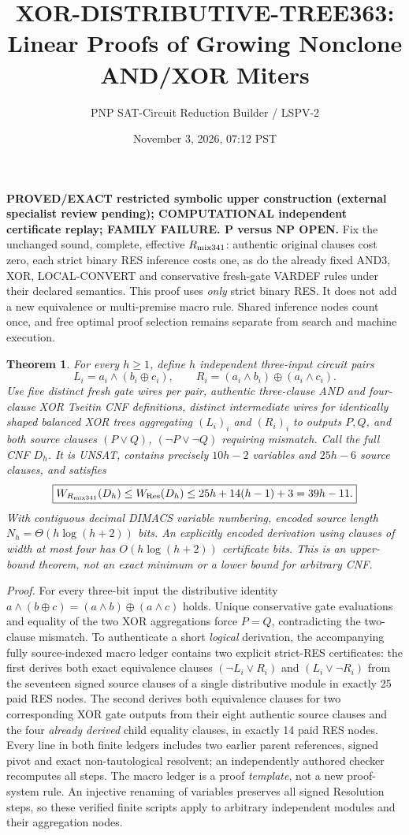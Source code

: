 \documentclass[11pt]{article}
\title{XOR-DISTRIBUTIVE-TREE363: Linear Proofs of Growing Nonclone AND/XOR Miters}
\author{PNP SAT-Circuit Reduction Builder / LSPV-2}
\date{November 3, 2026, 07:12 PST}
\newtheorem{theorem}{Theorem}
\begin{document}
\maketitle
\noindent\textbf{PROVED/EXACT restricted symbolic upper construction (external specialist review pending); COMPUTATIONAL independent certificate replay; FAMILY FAILURE. P versus NP OPEN.} Fix the unchanged sound, complete, effective $R_{\rm mix341}$: authentic original clauses cost zero, each strict binary RES inference costs one, as do the already fixed AND3, XOR, LOCAL-CONVERT and conservative fresh-gate VARDEF rules under their declared semantics. This proof uses \emph{only} strict binary RES. It does not add a new equivalence or multi-premise macro rule. Shared inference nodes count once, and free optimal proof selection remains separate from search and machine execution.
\begin{theorem}
For every $h\ge1$, define $h$ independent three-input circuit pairs
\[
L_i=a_i\land(b_i\oplus c_i),\qquad
R_i=(a_i\land b_i)\oplus(a_i\land c_i).
\]
Use five distinct fresh gate wires per pair, authentic three-clause AND and four-clause XOR Tseitin CNF definitions, distinct intermediate wires for identically shaped balanced XOR trees aggregating $(L_i)_i$ and $(R_i)_i$ to outputs $P,Q$, and \emph{both} source clauses $(P\lor Q)$, $(\neg P\lor\neg Q)$ requiring mismatch. Call the full CNF $D_h$. It is UNSAT, contains precisely $10h-2$ variables and $25h-6$ source clauses, and satisfies
\[
\boxed{W_{R_{\rm mix341}}(D_h)\le W_{\rm Res}(D_h)\le25h+14(h-1)+3=39h-11.}
\]
With contiguous decimal DIMACS variable numbering, encoded source length $N_h=\Theta(h\log(h+2))$ \emph{bits}. An explicitly encoded derivation using clauses of width at most four has $O(h\log(h+2))$ certificate bits. This is an upper-bound theorem, not an exact minimum or a lower bound for arbitrary CNF.
\end{theorem}
\noindent\emph{Proof.} For every three-bit input the distributive identity
$a\land(b\oplus c)=(a\land b)\oplus(a\land c)$ holds. Unique conservative gate evaluations and equality of the two XOR aggregations force $P=Q$, contradicting the two-clause mismatch. To authenticate a short \emph{logical} derivation, the accompanying fully source-indexed macro ledger contains two explicit strict-RES certificates: the first derives both exact equivalence clauses $(\neg L_i\lor R_i)$ and $(L_i\lor\neg R_i)$ from the seventeen signed source clauses of a single distributive module in exactly 25 paid RES nodes. The second derives both equivalence clauses for two corresponding XOR gate outputs from their eight authentic source clauses and the four \emph{already derived} child equality clauses, in exactly 14 paid RES nodes. Every line in both finite ledgers includes two earlier parent references, signed pivot and exact non-tautological resolvent; an independently authored checker recomputes all steps. The macro ledger is a proof \emph{template}, not a new proof-system rule. An injective renaming of variables preserves all signed Resolution steps, so these verified finite scripts apply to arbitrary independent modules and their aggregation nodes.
\end{document}
